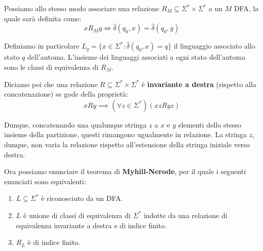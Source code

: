 \noindent Possiamo allo stesso modo associare una relazione $R_M\subseteq \Sigma^*\times \Sigma^*$ a un $M$ DFA, la quale sarà definita come: \[
    xR_M y \iff \hat{\delta}(q_0, x) = \hat{\delta}(q_0, y)
\]

\noindent Definiamo in particolare $L_q = \{x\in \Sigma^* : \hat{\delta}(q_0, x) = q\}$ il linguaggio associato allo stato $q$ dell'automa. L'insieme
dei linguaggi associati a ogni stato dell'automa sono le classi di equivalenza di $R_M$.\par
Diciamo poi che una relazione $R\subseteq \Sigma^* \times \Sigma^*$ è \textbf{invariante a destra} (rispetto alla concatenazione) se gode della
proprietà: \[
    xRy \implies (\forall z\in \Sigma^*)(xz R yz)
\]

\noindent Dunque, concatenando una qualunque stringa $z$ a $x$ e $y$ elementi dello stesso insieme della partizione, questi rimangono ugualmente in
relazione. La stringa $z$, dunque, non varia la relazione rispetto all'estensione della stringa iniziale verso destra.\par
Ora possiamo enunciare il teorema di \textbf{Myhill-Nerode}, per il quale i seguenti enunciati sono equivalenti: \begin{enumerate}
    \item $L\subseteq \Sigma^*$ è riconosciuto da un DFA.
    \item $L$ è unione di classi di equivalenza di $\Sigma^*$ indotte da una relazione di equivalenza invariante a destra e di indice finito.
    \item $R_L$ è di indice finito.
\end{enumerate}

